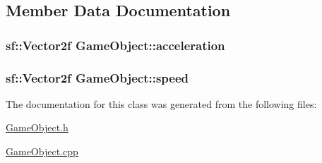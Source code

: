 \subsection{Member Data Documentation}
\hypertarget{class_game_object_a852964d6b689b4e12cc399fc67f4f8bf}{}
\subsubsection[{acceleration}]{\setlength{\rightskip}{0pt plus 5cm}sf\+::\+Vector2f Game\+Object\+::acceleration\hspace{0.3cm}{\ttfamily [protected]}}\label{class_game_object_a852964d6b689b4e12cc399fc67f4f8bf}
\hypertarget{class_game_object_a485ee182e36f89f5493801bdd3c88d4a}{}
\subsubsection[{speed}]{\setlength{\rightskip}{0pt plus 5cm}sf\+::\+Vector2f Game\+Object\+::speed}\label{class_game_object_a485ee182e36f89f5493801bdd3c88d4a}


The documentation for this class was generated from the following files\+:\begin{DoxyCompactItemize}
\item 
\hyperlink{_game_object_8h}{Game\+Object.\+h}\item 
\hyperlink{_game_object_8cpp}{Game\+Object.\+cpp}\end{DoxyCompactItemize}
